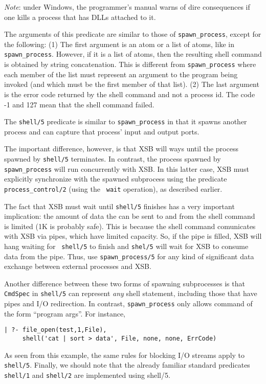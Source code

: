 \begin{description}
    \emph{Note}: under Windows, the programmer's manual warns of dire
    consequences if one kills a process that has DLLs attached to it.

    The arguments of this predicate are similar to those of
    \verb|spawn_process|, except for the following:
    (1) The first argument is an atom or a list of atoms, like in
    \verb|spawn_process|. However, if it is a list of atoms, then the
    resulting shell command is obtained by string concatenation. This is
    different from \verb|spawn_process| where each member of the list must
    represent an argument to the program being invoked (and which must be
    the first member of that list).  (2) The last argument is the error
    code returned by the shell command and not a process id. The code -1
    and 127 mean that the shell command failed.
    
    The {\tt shell/5} predicate is similar to \verb|spawn_process| in that
    it spawns another process and can capture that process' input and
    output ports.
    
    The important difference, however, is that XSB will ways until the
    process spawned by {\tt shell/5} terminates. In contrast, the process
    spawned by \verb|spawn_process| will run concurrently with XSB.  In
    this latter case, XSB must explicitly synchronize with the spawned
    subprocess using the predicate \verb|process_control/2| (using the {\tt
      wait} operation), as described earlier.
    
    The fact that XSB must wait until {\tt shell/5} finishes has a very
    important implication: the amount of data the can be sent to and from
    the shell command is limited (1K is probably safe). This is because the
    shell command comunicates with XSB via pipes, which have limited
    capacity.  So, if the pipe is filled, XSB will hang waiting for {\tt
      shell/5} to finish and {\tt shel/5} will wait for XSB to consume data
    from the pipe.  Thus, use \verb|spawn_process/5| for any kind of
    significant data exchange between external processes and XSB.
  
  Another difference between these two forms of spawning subprocesses is
  that {\tt CmdSpec} in {\tt shell/5} can represent \emph{any} shell
  statement, including those that have pipes and I/O redirection. In
  contrast, \verb|spawn_process| only allows command of the form ``program
  args''. For instance,
\begin{verbatim}
| ?- file_open(test,1,File),
     shell('cat | sort > data', File, none, none, ErrCode)
\end{verbatim}
As seen from this example, the same rules for blocking I/O streams
apply to {\tt shell/5}. Finally, we should note that the already familiar
standard predicates {\tt shell/1} and {\tt shell/2} are implemented using
shell/5.
\end{description}


